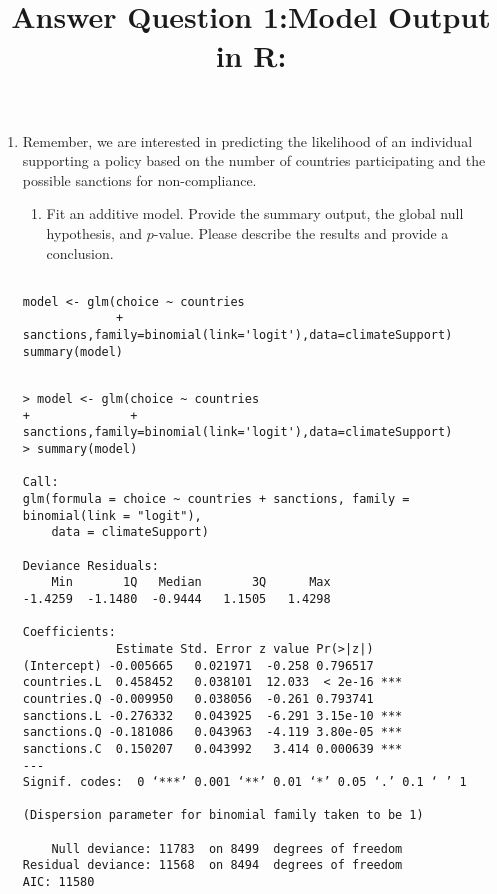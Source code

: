 \documentclass[12pt,letterpaper]{article}
\begin{document}
\begin{enumerate}
	\item
	Remember, we are interested in predicting the likelihood of an individual supporting a policy based on the number of countries participating and the possible sanctions for non-compliance.
	\begin{enumerate}
		\item [] Fit an additive model. Provide the summary output, the global null hypothesis, and $p$-value. Please describe the results and provide a conclusion.
	\end{enumerate}



 \title{Answer Question 1:} 

\begin{verbatim}
    
model <- glm(choice ~ countries 
             + sanctions,family=binomial(link='logit'),data=climateSupport)
summary(model)
\end{verbatim}

 \title{Model Output in R:} 

\begin{verbatim}
    
> model <- glm(choice ~ countries 
+              + sanctions,family=binomial(link='logit'),data=climateSupport)
> summary(model)

Call:
glm(formula = choice ~ countries + sanctions, family = binomial(link = "logit"), 
    data = climateSupport)

Deviance Residuals: 
    Min       1Q   Median       3Q      Max  
-1.4259  -1.1480  -0.9444   1.1505   1.4298  

Coefficients:
             Estimate Std. Error z value Pr(>|z|)    
(Intercept) -0.005665   0.021971  -0.258 0.796517    
countries.L  0.458452   0.038101  12.033  < 2e-16 ***
countries.Q -0.009950   0.038056  -0.261 0.793741    
sanctions.L -0.276332   0.043925  -6.291 3.15e-10 ***
sanctions.Q -0.181086   0.043963  -4.119 3.80e-05 ***
sanctions.C  0.150207   0.043992   3.414 0.000639 ***
---
Signif. codes:  0 ‘***’ 0.001 ‘**’ 0.01 ‘*’ 0.05 ‘.’ 0.1 ‘ ’ 1

(Dispersion parameter for binomial family taken to be 1)

    Null deviance: 11783  on 8499  degrees of freedom
Residual deviance: 11568  on 8494  degrees of freedom
AIC: 11580


\end{verbatim}
\end{enumerate}
\end{document}
